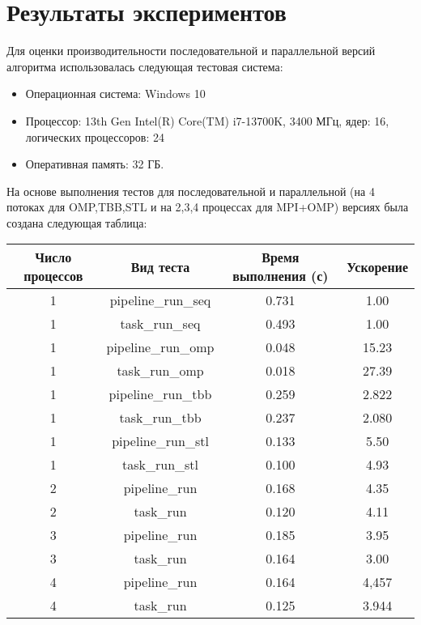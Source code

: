 \documentclass[a4paper,12pt]{article}
\begin{document}
\section{Результаты экспериментов}
Для оценки производительности последовательной и параллельной версий алгоритма использовалась следующая тестовая система:
\begin{itemize}
    \item Операционная система: Windows 10
    \item Процессор: 13th Gen Intel(R) Core(TM) i7-13700K, 3400 МГц, ядер: 16, логических процессоров: 24
    \item Оперативная память: 32 ГБ.
\end{itemize}
На основе выполнения тестов для последовательной и параллельной (на 4 потоках для OMP,TBB,STL и на 2,3,4 процессах для MPI+OMP) версиях была создана следующая таблица:\\[0,5cm]
\begin{tabular}{|c|c|c|c|}
    \hline
    Число процессов & Вид теста      & Время выполнения (с) & Ускорение \\ \hline
    1               & pipeline\_run\_seq & 0.731                & 1.00      \\ \hline
    1               & task\_run\_seq     & 0.493                & 1.00      \\ \hline
    1               & pipeline\_run\_omp & 0.048                & 15.23      \\ \hline
    1               & task\_run\_omp     & 0.018                & 27.39      \\ \hline
    1               & pipeline\_run\_tbb & 0.259                & 2.822      \\ \hline
    1               & task\_run\_tbb     & 0.237                & 2.080      \\ \hline
    1               & pipeline\_run\_stl & 0.133                & 5.50      \\ \hline
    1               & task\_run\_stl     & 0.100                & 4.93      \\ \hline
    2               & pipeline\_run & 0.168                & 4.35      \\ \hline
    2               & task\_run     & 0.120                & 4.11      \\ \hline
    3               & pipeline\_run & 0.185                & 3.95      \\ \hline
    3               & task\_run     & 0.164                & 3.00      \\ \hline
    4               & pipeline\_run & 0.164                & 4,457      \\ \hline
    4               & task\_run     & 0.125                & 3.944      \\ \hline
\end{tabular}
\newpage
\end{document}
